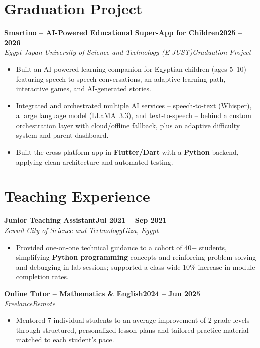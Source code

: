 \documentclass[11pt,a4paper]{article}
\newcommand{\role}[4]{%
  \noindent\textbf{#1}\hfill\textbf{#2}\\[0.3pt]%
  \textit{#3}\hfill\textit{#4}\par\vspace{1pt}%
}
\begin{document}
\section{Graduation Project}
\role{Smartino -- AI-Powered Educational Super-App for Children}{2025 -- 2026}{Egypt-Japan University of Science and Technology (E-JUST)}{Graduation Project}
\begin{itemize}
  \item Built an AI-powered learning companion for Egyptian children (ages 5--10) featuring
        speech-to-speech conversations, an adaptive learning path, interactive games, and
        AI-generated stories.
  \item Integrated and orchestrated multiple AI services -- speech-to-text (Whisper), a large
        language model (LLaMA~3.3), and text-to-speech -- behind a custom orchestration layer
        with cloud/offline fallback, plus an adaptive difficulty system and parent dashboard.
  \item Built the cross-platform app in \textbf{Flutter/Dart} with a \textbf{Python} backend, applying clean architecture and automated testing.
\end{itemize}

\section{Teaching Experience}

\role{Junior Teaching Assistant}{Jul 2021 -- Sep 2021}{Zewail City of Science and Technology}{Giza, Egypt}
\begin{itemize}
  \item Provided one-on-one technical guidance to a cohort of 40+ students, simplifying
        \textbf{Python programming} concepts and reinforcing problem-solving and debugging
        in lab sessions; supported a class-wide 10\% increase in module completion rates.
\end{itemize}

\role{Online Tutor -- Mathematics \& English}{2024 -- Jun 2025}{Freelance}{Remote}
\begin{itemize}
  \item Mentored 7 individual students to an average improvement of 2 grade levels through
        structured, personalized lesson plans and tailored practice material matched to each
        student's pace.
\end{itemize}
\end{document}
